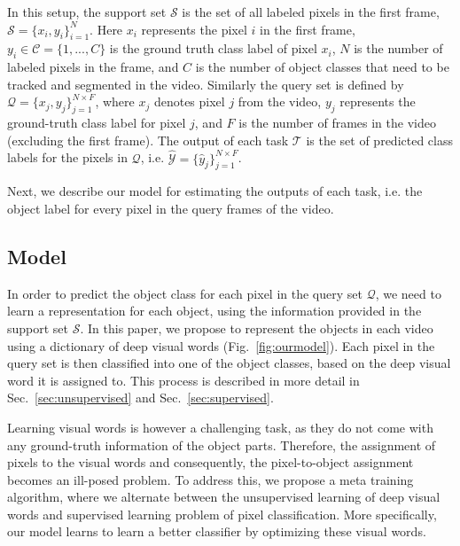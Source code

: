 \documentclass[10pt,twocolumn,letterpaper]{article}
\begin{document}
In this setup, the support set $\mathcal{S}$ is the set of all labeled pixels in the first frame, $ \mathcal{S} = \{ x_i, y_i \}_{i=1}^{N}$. Here $x_i$ represents the pixel $i$ in the first frame, $y_i \in \mathcal{C} = \{ 1,...,C \}$ is the ground truth class label of pixel $x_i$, $N$ is the number of labeled pixels in the frame, and $C$ is the number of object classes that need to be tracked and segmented in the video. Similarly the query set is defined by $ \mathcal{Q} = \{ x_j, y_j \}_{j=1}^{N\times F}$,  where $x_j$ denotes pixel $j$ from the video, $y_j$ represents the ground-truth class label for pixel $j$, and $F$ is the number of frames in the video (excluding the first frame). 
The output of each task $\mathcal{T}$ is the set of predicted class labels for the pixels in $ \mathcal{Q}$, i.e. $\mathcal{\hat{Y}} = \{\hat{y}_j\}_{j=1}^{N\times F}$. 
\fi

Next, we describe our model for estimating the outputs of each task, i.e. the object label for every pixel in the query frames of the video.

\subsection{Model}\label{sec:Model}
In order to predict the object class for each pixel in the query set $\mathcal{Q}$, we need to learn a representation for each object, using the information provided in the support set $\mathcal{S}$. In this paper, we propose to represent the objects in each video using a dictionary of deep visual words (Fig.~\ref{fig:ourmodel}). Each pixel in the query set is then classified into one of the object classes, based on the deep visual word it is assigned to.
This process is described in more detail in Sec.~\ref{sec:unsupervised} and Sec.~\ref{sec:supervised}. 

Learning visual words is however a challenging task, as they do not come with any ground-truth information of the object parts. Therefore, the assignment of pixels to the visual words and consequently, the pixel-to-object assignment becomes an ill-posed problem. To address this, we propose a meta training algorithm, where we alternate between the unsupervised learning of deep visual words and supervised learning problem of pixel classification. More specifically, our model learns to learn a better classifier by optimizing these visual words.
\end{document}
